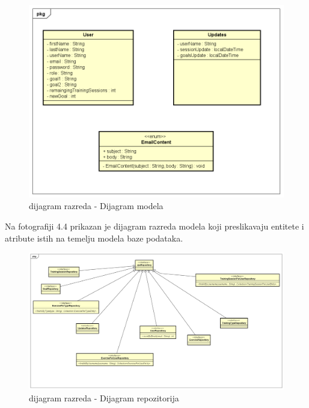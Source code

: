{{{{{{			
			
			\begin{figure}[H]
				\includegraphics[scale=0.6]{dijagrami/ModelsFinalVersion.png} %
				\centering
				\caption{dijagram razreda - Dijagram modela}
				\label{fig:diagramRAZ2}
			\end{figure}
			
			{Na fotografiji 4.4 prikazan je dijagram razreda modela koji preslikavaju entitete i atribute istih na temelju modela baze podataka. }
		
			\begin{figure}[H]
				\includegraphics[scale=0.3]{dijagrami/RepositoryFinalVersion.png} %
				\centering
				\caption{dijagram razreda - Dijagram repozitorija}
				\label{fig:diagramRAZ3}
			\end{figure}
		
}}}}}}
